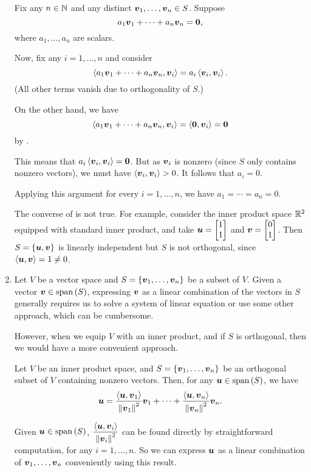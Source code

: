 \begin{enumerate}
\begin{pf}
Fix any \(n\in\mathbb{N}\) and any distinct \(\vb*{v}_1,\dotsc,\vb*{v}_n\in S\).
Suppose
\[
a_1\vb*{v}_1+\dotsb+a_n\vb*{v}_n=\vb*{0},
\]
where \(a_1,\dotsc,a_n\) are scalars.

Now, fix any \(i=1,\dotsc,n\) and consider
\[
\left\langle a_1\vb*{v}_1+\dotsb+a_n\vb*{v}_n,\vb*{v}_i\right\rangle=a_i\left\langle \vb*{v}_i,\vb*{v}_i\right\rangle.
\]
(All other terms vanish due to orthogonality of \(S\).)

On the other hand, we have
\[
\left\langle a_1\vb*{v}_1+\dotsb+a_n\vb*{v}_n,\vb*{v}_i\right\rangle
=\left\langle \vb*{0},\vb*{v}_i\right\rangle
=\vb*{0}
\]
by .

This means that \(a_i\left\langle \vb*{v}_i,\vb*{v}_i\right\rangle=\vb*{0}\). But as
\(\vb*{v}_i\) is nonzero (since \(S\) only contains nonzero vectors), we must
have \(\left\langle \vb*{v}_i,\vb*{v}_i\right\rangle>0\). It follows that \(a_i=0\).

Applying this argument for every \(i=1,\dotsc,n\), we have
\(a_1=\dotsb=a_n=0\).
\end{pf}

The converse of  is not true. For example, consider the
inner product space \(\mathbb{R}^2\) equipped with standard inner product, and take
\(\vect{u}=\mqty[1\\ 1]\) and \(\vect{v}=\mqty[0\\ 1]\). Then
\(S=\{\vb*{u},\vb*{v}\}\) is linearly independent but \(S\) is not orthogonal,
since \(\left\langle \vb*{u},\vb*{v}\right\rangle=1\ne 0\).

\item Let \(V\) be a vector space and \(S=\{\vb*{v}_1,\dotsc,\vb*{v}_n\}\) be
a subset of \(V\). Given a vector \(\vb*{v}\in \operatorname{span}\qty(S)\), expressing
\(\vb*{v}\) as a linear combination of the vectors in \(S\) generally requires
us to solve a system of linear equation or use some other approach, which can
be cumbersome.

However, when we equip \(V\) with an inner product, and if \(S\) is
orthogonal, then we would have a more convenient approach.

\begin{theorem}
\label{thm:orthog-lin-comb}
Let \(V\) be an inner product space, and \(S=\{\vb*{v}_1,\dotsc,\vb*{v}_n\}\)
be an orthogonal subset of \(V\) containing nonzero vectors. Then, for any
\(\vb*{u}\in\operatorname{span}\qty(S)\), we have
\[
\vb*{u}=\frac{\left\langle \vb*{u},\vb*{v}_1\right\rangle}{\norm{\vb*{v}_1}^{2}}\vb*{v}_1
+\dotsb+\frac{\left\langle \vb*{u},\vb*{v}_n\right\rangle}{\norm{\vb*{v}_n}^{2}}\vb*{v}_n.
\]
\end{theorem}
\begin{note}
Given \(\vb*{u}\in\operatorname{span}\qty(S)\), \(\displaystyle
\frac{\left\langle \vb*{u},\vb*{v}_i\right\rangle}{\norm{\vb*{v}_i}^{2}}\) can be found
directly by straightforward computation, for any \(i=1,\dotsc,n\). So we can
express \(\vb*{u}\) as a linear combination of
\(\vb*{v}_1,\dotsc,\vb*{v}_n\) conveniently using this result.
\end{note}


\end{enumerate}
